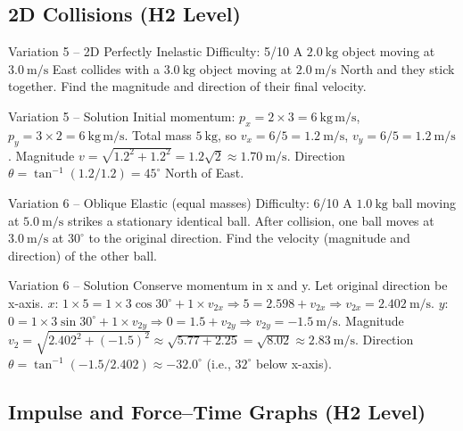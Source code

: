 \documentclass[11pt]{beamer}
\begin{document}
\subsection{2D Collisions (H2 Level)}

\begin{frame}[shrink=15]{Variation 5 – 2D Perfectly Inelastic \hfill Difficulty: 5/10}
A $2.0\ \mathrm{kg}$ object moving at $3.0\ \mathrm{m/s}$ East collides with a $3.0\ \mathrm{kg}$ object moving at $2.0\ \mathrm{m/s}$ North and they stick together. Find the magnitude and direction of their final velocity.
\end{frame}

\begin{frame}{Variation 5 – Solution}
Initial momentum: $p_x = 2\times3 = 6\ \mathrm{kg\,m/s}$, $p_y = 3\times2 = 6\ \mathrm{kg\,m/s}$.
Total mass $5\ \mathrm{kg}$, so $v_x = 6/5 = 1.2\ \mathrm{m/s}$, $v_y = 6/5 = 1.2\ \mathrm{m/s}$.
Magnitude $v = \sqrt{1.2^2+1.2^2} = 1.2\sqrt{2} \approx 1.70\ \mathrm{m/s}$.
Direction $\theta = \tan^{-1}(1.2/1.2) = 45^\circ$ North of East.
\end{frame}

\begin{frame}[shrink=15]{Variation 6 – Oblique Elastic (equal masses) \hfill Difficulty: 6/10}
A $1.0\ \mathrm{kg}$ ball moving at $5.0\ \mathrm{m/s}$ strikes a stationary identical ball. After collision, one ball moves at $3.0\ \mathrm{m/s}$ at $30^\circ$ to the original direction. Find the velocity (magnitude and direction) of the other ball.
\end{frame}

\begin{frame}{Variation 6 – Solution}
Conserve momentum in x and y. Let original direction be x-axis.
$x$: $1\times5 = 1\times3\cos30^\circ + 1\times v_{2x} \Rightarrow 5 = 2.598 + v_{2x} \Rightarrow v_{2x} = 2.402\ \mathrm{m/s}$.
$y$: $0 = 1\times3\sin30^\circ + 1\times v_{2y} \Rightarrow 0 = 1.5 + v_{2y} \Rightarrow v_{2y} = -1.5\ \mathrm{m/s}$.
Magnitude $v_2 = \sqrt{2.402^2 + (-1.5)^2} \approx \sqrt{5.77 + 2.25} = \sqrt{8.02} \approx 2.83\ \mathrm{m/s}$.
Direction $\theta = \tan^{-1}(-1.5/2.402) \approx -32.0^\circ$ (i.e., $32^\circ$ below x-axis).
\end{frame}

\subsection{Impulse and Force–Time Graphs (H2 Level)}
\end{document}
